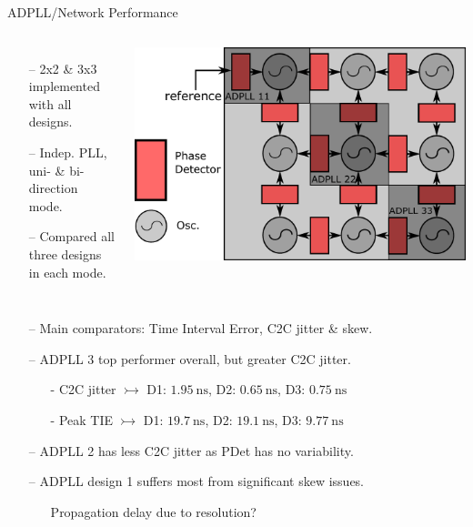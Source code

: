 \documentclass{beamer}
\begin{document}
\begin{frame}{ADPLL/Network Performance}
	\begin{columns}
		\begin{itemize}
			\item[--]
				2x2 \& 3x3 implemented with all designs.
			\item[--]
				Indep. PLL, uni- \& bi-direction mode.
			\item[--]
				Compared all three designs in each mode.
		\end{itemize}
		\includegraphics[width=\linewidth]{../network_annotated}
	\end{columns}
	\begin{itemize}
		\item[--]
			Main comparators: Time Interval Error, C2C jitter \& skew.
		\item[--]
			ADPLL 3 top performer overall, but greater C2C jitter.
			\begin{itemize}
				\item[-]
					C2C jitter $\rightarrowtail$ D1: $1.95~\si{\nano\second}$, D2: $0.65~\si{\nano\second}$, D3: $0.75~\si{\nano\second}$
				\item[-]
					Peak TIE $\rightarrowtail$ D1: $19.7~\si{\nano\second}$, D2: $19.1~\si{\nano\second}$, D3: $9.77~\si{\nano\second}$
			\end{itemize} 
		\item[--]
			ADPLL 2 has less C2C jitter as PDet has no variability.
		\item[--]
			ADPLL design 1 suffers most from significant skew issues.
			\begin{itemize}
				\item[]
					Propagation delay due to resolution?
			\end{itemize}  
	\end{itemize}
\end{frame}
\end{document}
